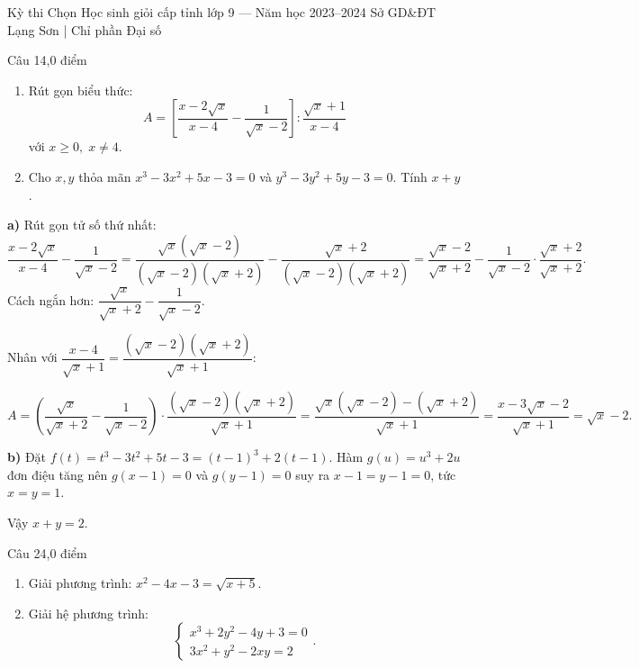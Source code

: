 ﻿%
%
  {Kỳ thi Chọn Học sinh giỏi cấp tỉnh lớp 9 — Năm học 2023--2024}%
  {Sở GD\&ĐT Lạng Sơn | Chỉ phần Đại số}

\begin{de_cau}{Câu 1}{4,0 điểm}
\begin{enumerate}[label=\alph*)]
  \item Rút gọn biểu thức:
  \[A = \left[\dfrac{x - 2\sqrt{x}}{x - 4} - \dfrac{1}{\sqrt{x} - 2}\right] : \dfrac{\sqrt{x}+1}{x-4}\]
  với $x \ge 0,\; x \neq 4$.
  \item Cho $x, y$ thỏa mãn $x^3 - 3x^2 + 5x - 3 = 0$ và $y^3 - 3y^2 + 5y - 3 = 0$. Tính $x + y$.
\end{enumerate}
\end{de_cau}

\begin{loi_giai_cau}
\textbf{a)} Rút gọn tử số thứ nhất:
\[\frac{x-2\sqrt{x}}{x-4} - \frac{1}{\sqrt{x}-2} = \frac{\sqrt{x}(\sqrt{x}-2)}{(\sqrt{x}-2)(\sqrt{x}+2)} - \frac{\sqrt{x}+2}{(\sqrt{x}-2)(\sqrt{x}+2)} = \frac{\sqrt{x}-2}{\sqrt{x}+2} - \frac{1}{\sqrt{x}-2} \cdot \frac{\sqrt{x}+2}{\sqrt{x}+2}.\]
Cách ngắn hơn: $\dfrac{\sqrt{x}}{\sqrt{x}+2} - \dfrac{1}{\sqrt{x}-2}$.

Nhân với $\dfrac{x-4}{\sqrt{x}+1} = \dfrac{(\sqrt{x}-2)(\sqrt{x}+2)}{\sqrt{x}+1}$:

\[A = \left(\frac{\sqrt{x}}{\sqrt{x}+2} - \frac{1}{\sqrt{x}-2}\right)\cdot\frac{(\sqrt{x}-2)(\sqrt{x}+2)}{\sqrt{x}+1} = \frac{\sqrt{x}(\sqrt{x}-2) - (\sqrt{x}+2)}{\sqrt{x}+1} = \frac{x-3\sqrt{x}-2}{\sqrt{x}+1} = \boxed{\sqrt{x}-2}.\]

\textbf{b)} Đặt $f(t) = t^3-3t^2+5t-3 = (t-1)^3 + 2(t-1)$. Hàm $g(u)=u^3+2u$ đơn điệu tăng nên $g(x-1)=0$ và $g(y-1)=0$ suy ra $x-1=y-1=0$, tức $x=y=1$.

Vậy $\boxed{x+y=2}$.
\end{loi_giai_cau}

\begin{de_cau}{Câu 2}{4,0 điểm}
\begin{enumerate}[label=\alph*)]
  \item Giải phương trình: $x^2 - 4x - 3 = \sqrt{x + 5}$.
  \item Giải hệ phương trình:
  \[\begin{cases} x^3 + 2y^2 - 4y + 3 = 0 \\ 3x^2 + y^2 - 2xy = 2 \end{cases}.\]
\end{enumerate}
\end{de_cau}

